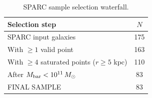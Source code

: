 \begin{table}[htbp]
\centering
\caption{SPARC sample selection waterfall.}
\label{tab:sample}
\begin{tabular}{lc}
\hline
Selection step & $N$ \\
\hline
SPARC input galaxies                          & 175 \\
With $\geq 1$ valid point                     & 163 \\
With $\geq 4$ saturated points ($r\geq 5$ kpc) & 110 \\
After $M_{\rm bar} < 10^{11}\,M_\odot$        & 83 \\
FINAL SAMPLE                                  & 83 \\
\hline
\end{tabular}
\end{table}
